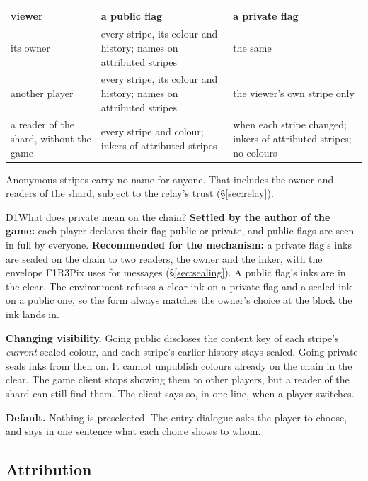 \documentclass[11pt,a4paper]{article}
\begin{document}
\begin{center}\small
\begin{tabularx}{\linewidth}{@{}>{\raggedright\arraybackslash}p{38mm} X X@{}}
\toprule
viewer & a public flag & a private flag\\
\midrule
its owner & every stripe, its colour and history; names on attributed stripes & the same\\
another player & every stripe, its colour and history; names on attributed stripes & the viewer's own stripe only\\
a reader of the shard, without the game & every stripe and colour; inkers of attributed stripes & when each stripe changed; inkers of attributed stripes; no colours\\
\bottomrule
\end{tabularx}
\end{center}

Anonymous stripes carry no name for anyone. That includes the owner and readers of the shard,
subject to the relay's trust (\S\ref{sec:relay}).

\begin{decision}{D1}{What does private mean on the chain?}
\textbf{Settled by the author of the game:} each player declares their flag public or private,
and public flags are seen in full by everyone. \textbf{Recommended for the mechanism:} a
private flag's inks are sealed on the chain to two readers, the owner and the inker, with the
envelope F1R3Pix uses for messages (\S\ref{sec:sealing}). A public flag's inks are in the clear.
The environment refuses a clear ink on a private flag and a sealed ink on a public one, so the
form always matches the owner's choice at the block the ink lands in.

\textbf{Changing visibility.} Going public discloses the content key of each stripe's
\emph{current} sealed colour, and each stripe's earlier history stays sealed. Going private
seals inks from then on. It cannot unpublish colours already on the chain in the clear. The game
client stops showing them to other players, but a reader of the shard can still find them. The
client says so, in one line, when a player switches.

\textbf{Default.} Nothing is preselected. The entry dialogue asks the player to choose, and says
in one sentence what each choice shows to whom.
\end{decision}

\subsection{Attribution}
\end{document}
